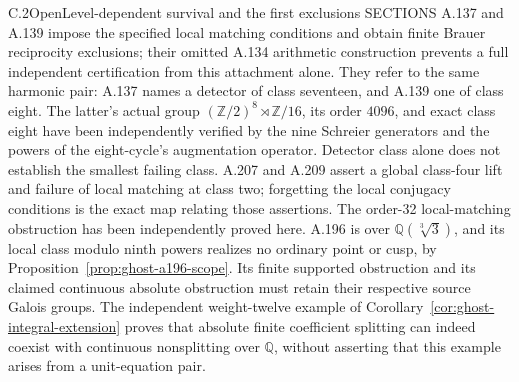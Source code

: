 \begin{result}{C.2}{Open}{Level-dependent survival and the first exclusions}
SECTIONS A.137 and A.139 impose the specified local matching
conditions and obtain finite Brauer reciprocity exclusions;
their omitted A.134 arithmetic construction prevents a full
independent certification from this attachment alone. They
refer to the same harmonic pair: A.137 names a detector of
class seventeen, and A.139 one of class eight. The latter's
actual group \((\mathbb Z/2)^8\rtimes\mathbb Z/16\), its
order \(4096\), and exact class eight have been independently
verified by the nine Schreier generators and the powers of
the eight-cycle's augmentation operator. Detector class alone
does not establish the smallest failing class. A.207
and A.209 assert a global class-four lift and failure of local
matching at class two; forgetting the local conjugacy
conditions is the exact map relating those assertions. The
order-32 local-matching obstruction has been independently
proved here. A.196 is over \(\mathbb Q(\sqrt[3]3)\), and
its local class modulo ninth powers realizes no ordinary
point or cusp, by Proposition~\ref{prop:ghost-a196-scope}.
Its finite supported obstruction and its claimed continuous
absolute obstruction must retain their respective source
Galois groups. The independent weight-twelve example of
Corollary~\ref{cor:ghost-integral-extension} proves that
absolute finite coefficient splitting can indeed coexist with
continuous nonsplitting over \(\mathbb Q\), without asserting
that this example arises from a unit-equation pair.


\end{result}
